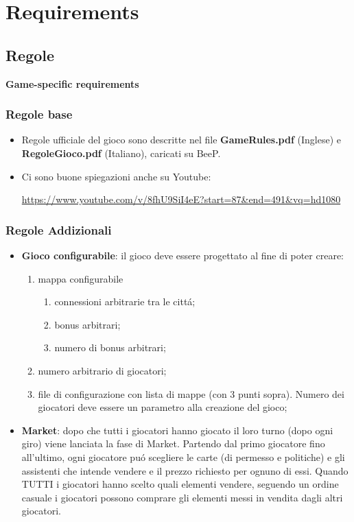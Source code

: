 \documentclass{beamer}
\begin{document}
\section{Requirements}

\subsection{Regole}

\begin{frame}

\LARGE	
\textbf{Game-specific requirements}

\end{frame}

\begin{frame}
  \frametitle{Regole base}

\begin{itemize}
\item Regole ufficiale del gioco sono descritte nel file \textbf{GameRules.pdf}
(Inglese) e \textbf{RegoleGioco.pdf} (Italiano), caricati su BeeP.

\item Ci sono buone spiegazioni anche su Youtube:

{\footnotesize
  \url{https://www.youtube.com/v/8fhU9SiI4eE?start=87&end=491&vq=hd1080}
}
\end{itemize}
\end{frame}

\begin{frame}
  \frametitle{Regole Addizionali}

\begin{itemize}
\item \textbf{Gioco configurabile}: 
il gioco deve essere progettato al fine di poter creare:
\begin{enumerate}
\item mappa configurabile
\begin{enumerate}
\item connessioni arbitrarie tra le citt\'a;
\item bonus arbitrari;
\item numero di bonus arbitrari;
\end{enumerate}
\item numero arbitrario di giocatori;
\item file di configurazione con lista di mappe (con 3 punti
  sopra). Numero dei giocatori deve essere un parametro alla creazione
  del gioco;
\end{enumerate}
\item \textbf{Market}: dopo che tutti i giocatori hanno giocato il
  loro turno (dopo ogni giro) viene lanciata la fase di Market.
 Partendo dal primo giocatore  fino all'ultimo, ogni giocatore pu\' o
 scegliere le carte (di permesso e politiche) e gli assistenti che intende vendere e il
 prezzo richiesto per ognuno di essi.
 Quando TUTTI i giocatori hanno scelto quali elementi vendere,
seguendo un ordine casuale i giocatori possono comprare gli elementi messi in vendita dagli altri giocatori.


\end{itemize}
\end{frame}
\end{document}
